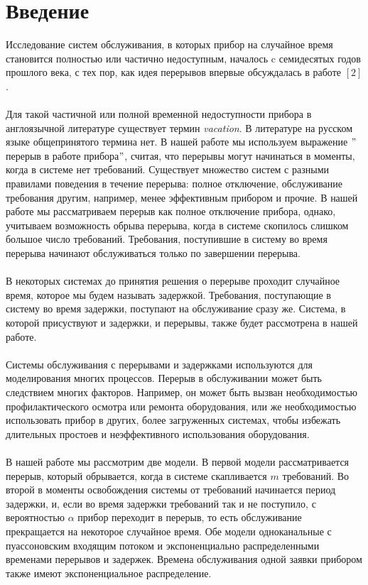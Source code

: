 \documentclass[12pt]{article}
\renewcommand{\contentsname}{ОГЛАВЛЕНИЕ}
\begin{document}
\renewcommand{\contentsname}{Оглавление}
\tableofcontents
\newpage
\section{Введение}
Исследование систем обслуживания, в которых прибор на случайное время становится полностью или частично недоступным, началось c семидесятых годов прошлого века, с тех пор, как идея перерывов впервые обсуждалась в работе $[2]$. \\
\\
Для такой частичной или полной временной недоступности прибора в англоязычной литературе существует термин \textit{vacation}. В литературе на русском языке общепринятого термина нет. В нашей работе мы используем выражение $"$перерыв в работе прибора$"$, считая, что перерывы могут начинаться в моменты, когда в системе нет требований. Существует множество систем с разными правилами поведения в течение перерыва: полное отключение, обслуживание требования другим, например, менее эффективным прибором и прочие. В нашей работе мы рассматриваем перерыв как полное отключение прибора, однако, учитываем возможность обрыва перерыва, когда в системе скопилось слишком большое число требований. Требования, поступившие в систему во время перерыва начинают обслуживаться только по завершении перерыва.\\
\\
В некоторых системах до принятия решения о перерыве проходит случайное время, которое мы будем называть задержкой. Требования, поступающие в систему во время задержки, поступают на обслуживание сразу же. Система, в которой присуствуют и задержки, и перерывы, также будет рассмотрена в нашей работе.\\
\\
Системы обслуживания с перерывами и задержками используются для моделирования многих процессов. Перерыв в обслуживании может быть следствием многих факторов. Например, он может быть вызван необходимостью профилактического осмотра или ремонта оборудования, или же необходимостью использовать прибор в других, более загруженных системах, чтобы избежать длительных простоев и неэффективного использования оборудования. \\
\\
В нашей работе мы рассмотрим две модели. В первой модели рассматривается перерыв, который обрывается, когда в системе скапливается $m$ требований. Во второй в моменты освобождения системы от требований начинается период задержки, и, если во время задержки требований так и не поступило, с вероятностью $\alpha$ прибор переходит в перерыв, то есть обслуживание прекращается на некоторое случайное время. Обе модели одноканальные с пуассоновским входящим потоком и экспоненциально распределенными временами перерывов и задержек. Времена обслуживания одной заявки прибором также имеют экспоненциальное распределение.\\
\end{document}
